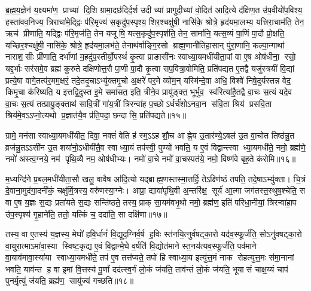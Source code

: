 ब्र॒ह्म॒य॒ज्ञेन॑ य॒क्ष्यमा॑ण॒ प्राच्यां दि॒शि ग्रामा॒दछ॑दिर्द॒र्\mbox{}श उदीच्यां प्रागुदी॒च्यां वो॒दित॑ आदि॒त्ये द॑क्षिण॒त उ॑प॒वीयो॑प॒विश्य॒ हस्ता॑वव॒निज्य॒ त्रिराचा॑मे॒द्द्विः प॑रि॒मृज्य॑ स॒कृदु॑प॒स्पृश्य॒ शिर॒श्चक्षु॑षी॒ नासि॑के॒ श्रोत्रे॒ हृद॑यमा॒लभ्य॒ यत्त्रिरा॒चाम॑ति॒ तेन॒ ऋच॑ प्रीणाति॒ यद्द्विः प॑रि॒मृज॑ति॒ तेन यजूषि॒ यत्स॒कृदु॑प॒स्पृश॑ति॒ तेन॒ सामा॑नि॒ यत्स॒व्यं पा॒णिं पा॒दौ प्रो॒क्षति॒ यच्छिर॒श्चक्षु॑षी॒ नासि॑के॒ श्रोत्रे॒ हृद॑यमा॒लभ॑ते॒ तेनाथ॑र्वाङ्गि॒रसो ब्राह्म॒णानी॑तिहा॒सान् पु॑रा॒णानि॒ कल्पा॒न्गाथा॑ नाराश॒सीः प्री॑णाति॒ दर्भा॑णां म॒हदु॑प॒स्तीर्यो॒पस्थं॑ कृ॒त्वा प्राङासी॑नः स्वाध्या॒यमधी॑यीता॒पां वा ए॒ष ओष॑धीना॒ रसो॒ यद्द॒र्भाः सर॑समे॒व ब्रह्म॑ कुरुते दक्षिणोत्त॒रौ पा॒णी पा॒दौ कृ॒त्वा सप॒वित्रा॒वोमिति॒ प्रति॑पद्यत ए॒तद्वै यजु॑स्त्रयीं वि॒द्यां प्रत्ये॒षा वागे॒तत्प॑र॒मम॒क्षरं॒ तदे॒तदृ॒चाऽभ्यु॑क्तमृ॒चो अ॒क्षरे॑ पर॒मे व्यो॑म॒न् यस्मि॑न्दे॒वा अधि॒ विश्वे॑ निषे॒दुर्यस्तन्न वेद॒ किमृ॒चा क॑रिष्यति॒ य इत्तद्वि॒दुस्त इ॒मे समा॑सत॒ इति॒ त्रीने॒व प्रायु॑ङ्क्त॒ भूर्भुव॒ स्व॑रित्या॑है॒तद्वै वा॒चः स॒त्यं यदे॒व वा॒चः स॒त्यं तत्प्रायु॒ङ्क्ताथ॑ सावि॒त्रीं गा॑य॒त्रीं त्रिरन्वा॑ह प॒च्छोऽर्धर्च॑शोऽनवा॒न स॑वि॒ता श्रिय॑ प्रसवि॒ता श्रिय॑मे॒वऽऽप्नो॒त्यथो प्र॒ज्ञात॑यै॒व प्र॑ति॒पदा॒ छन्दासि॒ प्रति॑पद्यते॥१५॥\anuvakamend


ग्रामे॒ मन॑सा स्वाध्या॒यमधी॑यीत॒ दिवा॒ नक्तं॑ वेति ह॑ स्म॒ऽऽह शौ॒च आह्ने॒य उ॒तार॑ण्ये॒ऽबल॑ उ॒त वा॒चोत तिष्ठ॑न्नु॒त व्रज॑न्नु॒तऽऽसी॑न उ॒त शया॑नो॒ऽधीयी॑तै॒व स्वाध्या॒यं तप॑स्वी॒ पुण्यो॑ भवति॒ य ए॒वं विद्वान्त्स्वाध्या॒यमधी॑ते॒ नमो॒ ब्रह्म॑णे॒ नमो॑ अस्त्व॒ग्नये॒ नम॑ पृथि॒व्यै नम॒ ओष॑धीभ्यः। नमो॑ वा॒चे नमो॑ वा॒चस्पत॑ये॒ नमो॒ विष्ण॑वे बृह॒ते क॑रोमि॥१६॥
\anuvakamend


म॒ध्यन्दि॑ने प्र॒बल॒मधी॑यीता॒सौ खलु॒ वावैष आ॑दि॒त्यो यद्ब्राह्म॒ण\-स्तस्मा॒त्तर्\mbox{}हि॒ तेऽक्ष्णि॑ष्ठं तपति॒ तदे॒षाऽभ्यु॑क्ता। चि॒त्रं दे॒वाना॒मुद॑गा॒\-दनी॑कं॒ चक्षु॑र्मि॒त्रस्य॒ वरु॑णस्या॒ग्नेः। आप्रा॒ द्यावा॑पृथि॒वी अ॒न्तरि॑क्ष॒ सूर्य॑ आ॒त्मा जग॑तस्त॒स्थुष॒श्चेति॒ स वा ए॒ष य॒ज्ञः स॒द्यः प्रता॑यते स॒द्यः सन्ति॑ष्ठते॒ तस्य॒ प्राक् सा॒यम॑वभृ॒थो नमो॒ ब्रह्म॑ण॒ इति॑ परिधा॒नीयां॒ त्रिरन्वा॑हा॒प उ॑प॒स्पृश्य॑ गृ॒हाने॑ति॒ ततो॒ यत्किं च॒ ददा॑ति॒ सा दक्षि॑णा॥१७॥\anuvakamend


तस्य॒ वा ए॒तस्य॑ य॒ज्ञस्य॒ मेघो॑ हवि॒र्धानं॑ वि॒द्युद॒ग्निर्\mbox{}व॒र्\mbox{}ष ह॒विः स्त॑नयि॒त्नुर्व॑षट्का॒रो यद॑व॒स्फूर्ज॑ति॒ सोऽनु॑वषट्का॒रो वा॒युरा॒त्माऽमा॑वा॒स्या स्विष्ट॒कृद्य ए॒वं वि॒द्वान्मे॒घे व॒र्\mbox{}षति॑ वि॒द्योत॑माने स्त॒नय॑त्यव॒स्फूर्ज॑ति॒ पव॑माने वा॒याव॑मावा॒स्या॑या स्वाध्या॒यमधी॑ते॒ तप॑ ए॒व तत्त॑प्यते॒ तपो॑ हि स्वाध्या॒य इत्यु॑त्त॒मं नाक रोहत्युत्त॒मः स॑मा॒नानां भवति॒ याव॑न्त ह॒ वा इ॒मां वि॒त्तस्य॑ पू॒र्णां दद॑त्स्व॒र्गं लो॒कं ज॑यति॒ ताव॑न्तं लो॒कं ज॑यति॒ भूयासं चाक्ष॒य्यं चाप॑ पुनर्मृ॒त्युं ज॑यति॒ ब्रह्म॑ण॒ सायु॑ज्यं गच्छति॥१८॥\anuvakamend


